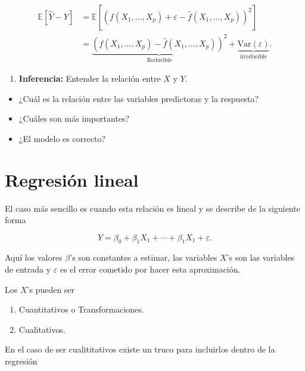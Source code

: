 \documentclass[
  12pt,
]{book}
\providecommand{\tightlist}{%
  \setlength{\itemsep}{0pt}\setlength{\parskip}{0pt}}
\theoremstyle{definition}
\theoremstyle{definition}
\theoremstyle{definition}
\theoremstyle{remark}
\begin{document}
\begin{align*}
\mathbb{E}\left[\hat{Y}-Y\right] 
&=  \mathbb{E}\left[\left(  f(X_{1},\ldots,X_{p}) + \varepsilon - \hat{f}(X_{1},\ldots,X_{p}) \right)^{2}  \right] \\
&= \underbrace{\left( f(X_{1},\ldots,X_{p})- \hat{f}(X_{1},\ldots,X_{p})  \right) ^{2} }_{\text{Reducible}}
+\underbrace{\mathrm{Var}\left(\varepsilon\right)}_{\text{irreducible}}. 
\end{align*}

\begin{enumerate}
\def\labelenumi{\arabic{enumi}.}
\setcounter{enumi}{1}
\tightlist
\item
  \textbf{Inferencia:} Entender la relación entre \(X\) y \(Y\).
\end{enumerate}

\begin{itemize}
\tightlist
\item
  ¿Cuál es la relación entre las variables predictoras y la respuesta?
\item
  ¿Cuáles son más importantes?
\item
  ¿El modelo es correcto?
\end{itemize}

\hypertarget{regresiuxf3n-lineal}{%
\section{Regresión lineal}\label{regresiuxf3n-lineal}}

El caso más sencillo es cuando esta relación es lineal y se describe de la siguiente forma

\begin{equation*}
Y = \beta_{0} + \beta_{1}X_{1} + \cdots +  \beta_{1}X_{1} + \varepsilon.
\end{equation*}

Aquí los valores \(\beta\)'s son constantes a estimar, las variables \(X\)'s son las variables de entrada y \(\varepsilon\) es el error cometido por hacer esta aproximación.

Los \(X\)'s pueden ser

\begin{enumerate}
\def\labelenumi{\arabic{enumi}.}
\tightlist
\item
  Cuantitativos o Transformaciones.
\item
  Cualitativos.
\end{enumerate}

En el caso de ser cualititativos existe un truco para incluirlos dentro de la regresión
\end{document}
